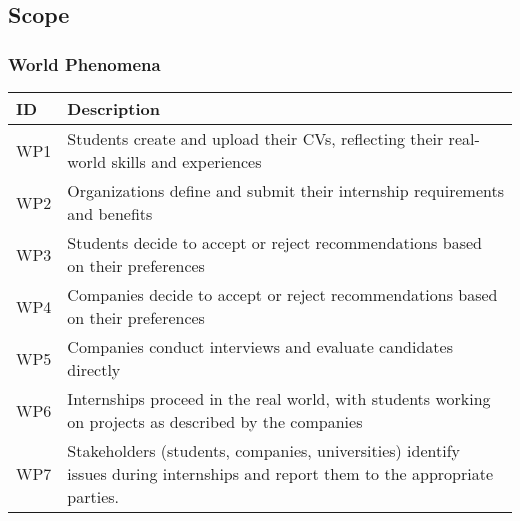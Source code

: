 \subsection{Scope} 

\subsubsection{World Phenomena}
\begin{center}
    {\renewcommand{\arraystretch}{2}
    \begin{tabularx}{\textwidth}{p{2cm} X}
        \hline
        \textbf{ID} & \textbf{Description} \\ \hline
        WP1 & Students create and upload their CVs, reflecting their real-world skills and experiences \\ \hline
        WP2 & Organizations define and submit their internship requirements and benefits \\ \hline
        WP3 & Students decide to accept or reject recommendations based on their preferences \\ \hline
        WP4 & Companies decide to accept or reject recommendations based on their preferences \\ \hline
        WP5 & Companies conduct interviews and evaluate candidates directly \\ \hline
        WP6 & Internships proceed in the real world, with students working on projects as described by the companies \\ \hline
        WP7 & Stakeholders (students, companies, universities) identify issues during internships and report them to the appropriate parties. \\ \hline
    \end{tabularx}}
\end{center}

